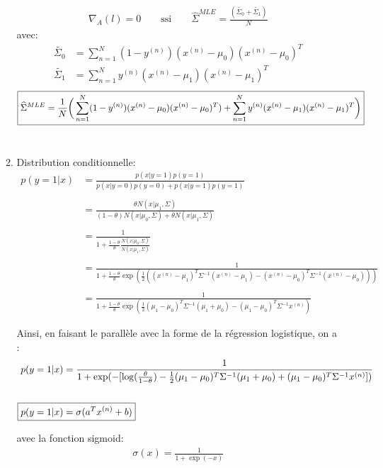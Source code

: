 \documentclass{article}
\begin{document}
\begin{enumerate}
\begin{enumerate}[label=(\alph*)]
\begin{align*}
\nabla_A(l)=0  \qquad \textrm{ssi} \qquad \widehat{\Sigma}^{MLE}=\frac{(\widetilde{\Sigma_0}+\widetilde{\Sigma_1})}{N}
\end{align*}
avec:
\begin{align*}
\widetilde{\Sigma_0} &= \sum_{n=1}^{N}(1-y^{(n)})(x^{(n)}- \mu_0)(x^{(n)} -\mu_0)^{T} \\
\widetilde{\Sigma_1} &= \sum_{n=1}^{N}y^{(n)}(x^{(n)}- \mu_1)(x^{(n)} -\mu_1)^{T}
\end{align*}
\begin{align*}
    \Aboxed{\widehat{\Sigma}^{MLE}= \frac{1}{N}\bigg(\sum_{n=1}^{N}(1-y^{(n)})(x^{(n)}- \mu_0)(x^{(n)} -\mu_0)^{T}) + \sum_{n=1}^{N}y^{(n)}(x^{(n)}- \mu_1)(x^{(n)} -\mu_1)^{T}\bigg)}
\end{align*}
\\
\item Distribution conditionnelle:\\
\begin{align*} 
p(y=1|x)&=\frac{p(x|y=1)p(y=1)}{p(x|y=0)p(y=0) + p(x|y=1)p(y=1)} \\
\\&=\frac{\theta N(x|\mu_1,\Sigma)}{(1-\theta)N(x|\mu_0,\Sigma) + \theta N(x|\mu_1,\Sigma)}\\
\\&=\frac{1}{1+\frac{1-\theta}{\theta}\frac{N(x|\mu_0,\Sigma)}{N(x|\mu_1,\Sigma)}}\\
\\&=\frac{1}{1+\frac{1-\theta}{\theta}\exp(\frac{1}{2}((x^{(n)} - \mu_1)^{T} \Sigma^{-1}(x^{(n)} - \mu_1)-(x^{(n)} - \mu_0)^{T} \Sigma^{-1}(x^{(n)} - \mu_0)))}\\
\\&=\frac{1}{1+\frac{1-\theta}{\theta}\exp(\frac{1}{2}(\mu_1-\mu_0)^T\Sigma^{-1}(\mu_1+\mu_0)-(\mu_1-\mu_0)^T\Sigma^{-1}x^{(n)})}
\end{align*}

Ainsi, en faisant le parallèle avec la forme de la régression logistique, on a :
\begin{align*} 
p(y=1|x)&=\frac{1}{1+\exp(-[\log(\frac{\theta}{1-\theta})-\frac{1}{2}(\mu_1-\mu_0)^T\Sigma^{-1}(\mu_1+\mu_0)+(\mu_1-\mu_0)^T\Sigma^{-1}x^{(n)}])}\\
\\\Aboxed{p(y=1|x)&= \sigma(a^Tx^{(n)}+b)}
\end{align*}

avec la fonction sigmoid:
\begin{align*} 
\sigma(x)=\frac{1}{1+\exp(-x)}
\end{align*}


\end{enumerate}
\end{enumerate}
\end{document}
